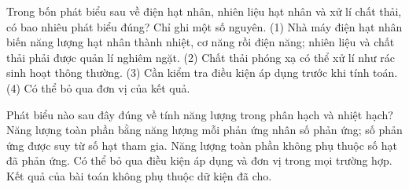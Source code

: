 \begin{ex}
Trong bốn phát biểu sau về điện hạt nhân, nhiên liệu hạt nhân và xử lí chất thải, có bao nhiêu phát biểu đúng? Chỉ ghi một số nguyên. (1) Nhà máy điện hạt nhân biến năng lượng hạt nhân thành nhiệt, cơ năng rồi điện năng; nhiên liệu và chất thải phải được quản lí nghiêm ngặt. (2) Chất thải phóng xạ có thể xử lí như rác sinh hoạt thông thường. (3) Cần kiểm tra điều kiện áp dụng trước khi tính toán. (4) Có thể bỏ qua đơn vị của kết quả.
\end{ex}

\begin{ex}
Phát biểu nào sau đây đúng về tính năng lượng trong phân hạch và nhiệt hạch?
\choice
{\True Năng lượng toàn phần bằng năng lượng mỗi phản ứng nhân số phản ứng; số phản ứng được suy từ số hạt tham gia.}
{Năng lượng toàn phần không phụ thuộc số hạt đã phản ứng.}
{Có thể bỏ qua điều kiện áp dụng và đơn vị trong mọi trường hợp.}
{Kết quả của bài toán không phụ thuộc dữ kiện đã cho.}
\end{ex}

